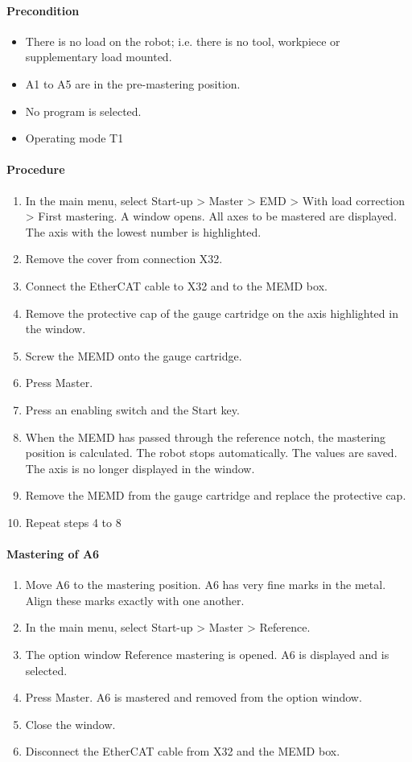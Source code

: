 		\paragraph{Precondition}
		\begin{itemize}
			\item There is no load on the robot; i.e. there is no tool, workpiece or supplementary load mounted.
			\item A1 to A5 are in the pre-mastering position.
			\item No program is selected.
			\item Operating mode T1
		\end{itemize}
		
		\paragraph{Procedure}
		\begin{enumerate}
			\item In the main menu, select Start-up > Master > EMD > With load correction > First mastering. A window opens. All axes to be mastered are displayed. The axis with the lowest number is highlighted.
			\item Remove the cover from connection X32.
			\item Connect the EtherCAT cable to X32 and to the MEMD box.
			\item Remove the protective cap of the gauge cartridge on the axis highlighted in the window.
			\item Screw the MEMD onto the gauge cartridge.
			\item Press Master.
			\item Press an enabling switch and the Start key.
			\item When the MEMD has passed through the reference notch, the mastering position is calculated. The robot stops automatically. The values are saved. The axis is no longer displayed in the window.
			\item Remove the MEMD from the gauge cartridge and replace the protective cap.
			\item Repeat steps 4 to 8 
		\end{enumerate}
	
		\paragraph{Mastering of A6}
		\begin{enumerate}
			\item Move A6 to the mastering position. A6 has very fine marks in the metal. Align these marks exactly with one another.
			\item In the main menu, select Start-up > Master > Reference.
			\item The option window Reference mastering is opened. A6 is displayed and is selected.
			\item Press Master. A6 is mastered and removed from the option window.
			\item Close the window.
			\item Disconnect the EtherCAT cable from X32 and the MEMD box.
		\end{enumerate}
		
